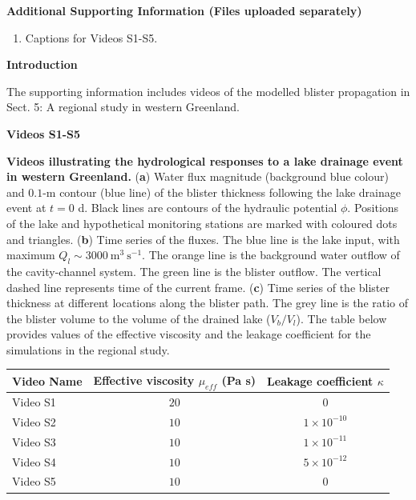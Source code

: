 \documentclass[draft,jgrga]{agutexSI2019}
\begin{document}
\begin{article}

\noindent\textbf{Additional Supporting Information (Files uploaded separately)}
\begin{enumerate}
\item Captions for Videos S1-S5.
\end{enumerate}

\noindent\textbf{Introduction}

The supporting information includes videos of the modelled blister propagation in Sect. 5: A regional study in western Greenland.

\noindent\textbf{Videos S1-S5} %

\textbf{Videos illustrating the hydrological responses to a lake drainage event in western Greenland.}
(\textbf{a}) Water flux magnitude (background blue colour) and $0.1$-m contour (blue line) of the blister thickness following the lake drainage event at $t=0$ d. Black lines are contours of the hydraulic potential $\phi$. Positions of the lake and hypothetical monitoring stations are marked with coloured dots and triangles. (\textbf{b}) Time series of the fluxes. The blue line is the lake input, with maximum $Q_{l}\sim3000\ \text{m}^3 \ \text{s}^{-1}$. The orange line is the background water outflow of the cavity-channel system. The green line is the blister outflow. The vertical dashed line represents time of the current frame. (\textbf{c}) Time series of the blister thickness at different locations along the blister path. The grey line is the ratio of the blister volume to the volume of the drained lake ($V_b/V_l$). The table below provides values of the effective viscosity and the leakage coefficient for the simulations in the regional study.

%  
\end{article}

\begin{table}[ht!]
    \centering
    \begin{tabular}{lcc}
        \hline
        Video Name \hspace{0.25cm} & Effective viscosity $\mu_{eff}$ (Pa s) \hspace{0.25cm} & Leakage coefficient $\kappa$ \\   
        \hline
        Video S1 & $20$ & $0$ \\
        Video S2 & $10$ & $1\times10^{-10}$\\
        Video S3 & $10$ & $1\times10^{-11}$\\
        Video S4 & $10$ & $5\times10^{-12}$\\
        Video S5 & $10$ & $0$\\
        \hline    
    \end{tabular}
    \label{tab:video_info}
\end{table}
\end{document}
